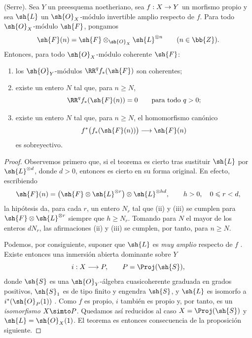 \documentclass[oneside]{amsart}
\makeatletter
\renewcommand{\leq}{\leqslant}
\renewcommand{\geq}{\geqslant}
\newcommand{\ega@arrow}[2]{\mathchoice{#1}{#2}{#2}{#2}}
\renewcommand{\to}{\ega@arrow{\longrightarrow}{\rightarrow}}
\let\EGAOriginalLabel\label
\renewcommand{\label}[1]{\phantomsection\EGAOriginalLabel{#1}}
\makeatother
\begin{document}
\begin{theorem}[2.2.1]
\label{III.2.2.1}
(Serre).
Sea $Y$ un preesquema noetheriano, sea $f:X\to Y$ un morfismo propio y sea $\sh{L}$ un $\sh{O}_X$-módulo invertible amplio respecto de $f$.
Para todo $\sh{O}_X$-módulo $\sh{F}$, pongamos
\[
  \sh{F}(n)=\sh{F}\otimes_{\sh{O}_X}\sh{L}^{\otimes n}
  \qquad(n\in\bb{Z}).
\]
Entonces, para todo $\sh{O}_X$-módulo coherente $\sh{F}$:
\begin{enumerate}
  \item[{\rm(i)}] los $\sh{O}_Y$-módulos $\RR^qf_*(\sh{F})$ son coherentes;
  \item[{\rm(ii)}] existe un entero $N$ tal que, para $n\geq N$,
  \[
    \RR^qf_*(\sh{F}(n))=0
    \qquad\text{para todo }q>0;
  \]
  \item[{\rm(iii)}] existe un entero $N$ tal que, para $n\geq N$, el homomorfismo canónico
  \[
    f^*\bigl(f_*(\sh{F}(n))\bigr)\longrightarrow\sh{F}(n)
  \]
  es sobreyectivo.
\end{enumerate}
\end{theorem}

\begin{proof}
Observemos primero que, si el teorema es cierto tras sustituir $\sh{L}$ por $\sh{L}^{\otimes d}$, donde $d>0$, entonces es cierto en su forma original.
En efecto, escribiendo
\[
  \sh{F}(n)
  =\bigl(\sh{F}\otimes\sh{L}^{\otimes r}\bigr)
   \otimes\sh{L}^{\otimes hd},
   \qquad h>0,\quad 0\leq r<d,
\]
la hipótesis da, para cada $r$, un entero $N_r$ tal que (ii) y (iii) se cumplen para $\sh{F}\otimes\sh{L}^{\otimes r}$ siempre que $h\geq N_r$.
Tomando para $N$ el mayor de los enteros $dN_r$, las afirmaciones (ii) y (iii) se cumplen, por tanto, para $n\geq N$.

Podemos, por consiguiente, suponer que $\sh{L}$ es \emph{muy amplio} respecto de $f$ .
Existe entonces una inmersión abierta dominante sobre $Y$
\[
  i:X\longrightarrow P,
  \qquad P=\Proj(\sh{S}),
\]
donde $\sh{S}$ es una $\sh{O}_Y$-álgebra cuasicoherente graduada en grados positivos, $\sh{S}_1$ es de tipo finito y engendra $\sh{S}$, y $\sh{L}$ es isomorfo a $i^*(\sh{O}_P(1))$ .
Como $f$ es propio, $i$ también es propio  y, por tanto, es un \emph{isomorfismo} $X\simto P$.
Quedamos así reducidos al caso $X=\Proj(\sh{S})$ y $\sh{L}=\sh{O}_X(1)$.
El teorema es entonces consecuencia de la proposición siguiente.
\end{proof}
\end{document}
